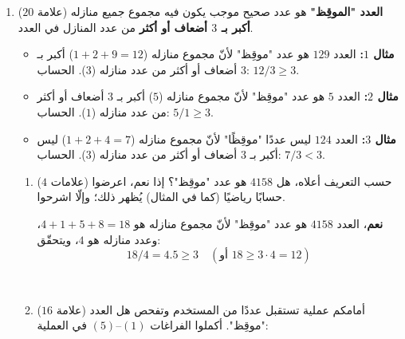 \documentclass[14pt]{extarticle}
\begin{document}
\begin{enumerate}[resume, label=\textbf{السؤال \arabic*:}, wide=0pt, itemsep=2.2em]
\ifwithsols
\begin{boxSolution}
\begin{enumerate}[label=(\arabic*)]
\item \textenglish{\texttt{input}}
\item \textenglish{\texttt{len(msg)}}
\item \textenglish{\texttt{msg[i]}}
\item \textenglish{\texttt{"\^{}"}}
\item \textenglish{\texttt{result}}
\end{enumerate}
\end{boxSolution}
\fi
\filbreak

\item ($20$ علامة) \textbf{العدد "الموقِظ"} هو عدد صحيح موجب يكون فيه مجموع جميع منازله \textbf{أكبر بـ $3$ أضعاف أو أكثر} من عدد المنازل في العدد.
\begin{itemize}
\item \textbf{مثال $1$:} العدد $129$ هو عدد "موقِظ" لأنّ مجموع منازله ($1 + 2 + 9 = 12$) أكبر بـ $3$ أضعاف أو أكثر من عدد منازله ($3$). الحساب: $12 / 3 \geq 3$.
\item \textbf{مثال $2$:} العدد $5$ هو عدد "موقِظ" لأنّ مجموع منازله ($5$) أكبر بـ $3$ أضعاف أو أكثر من عدد منازله ($1$). الحساب: $5 / 1 \geq 3$.
\item \textbf{مثال $3$:} العدد $124$ ليس عددًا "موقِظًا" لأنّ مجموع منازله ($1 + 2 + 4 = 7$) ليس أكبر بـ $3$ أضعاف أو أكثر من عدد منازله ($3$). الحساب: $7 / 3 < 3$.
\end{itemize}

\begin{enumerate}[label=\alph*.]
\item ($4$ علامات) حسب التعريف أعلاه، هل $4158$ هو عدد "موقِظ"؟ إذا نعم، اعرضوا حسابًا رياضيًا (كما في المثال) يُظهر ذلك؛ وإلّا اشرحوا.
\ifwithsols
\begin{boxSolution}
\textbf{نعم}، العدد $4158$ هو عدد "موقِظ" لأنّ مجموع منازله هو $4 + 1 + 5 + 8 = 18$، وعدد منازله هو $4$، ويتحقّق:
$$18 / 4 = 4.5 \geq 3 \quad (\text{أو } 18 \geq 3 \cdot 4 = 12)$$
\end{boxSolution}
\else
\\ \underline{\hspace{14cm}}
\fi
\filbreak

\item ($16$ علامة) أمامكم عملية تستقبل عددًا من المستخدم وتفحص هل العدد "موقِظ". أكملوا الفراغات $(1)$–$(5)$ في العملية:


\end{enumerate}
\end{enumerate}
\end{document}
